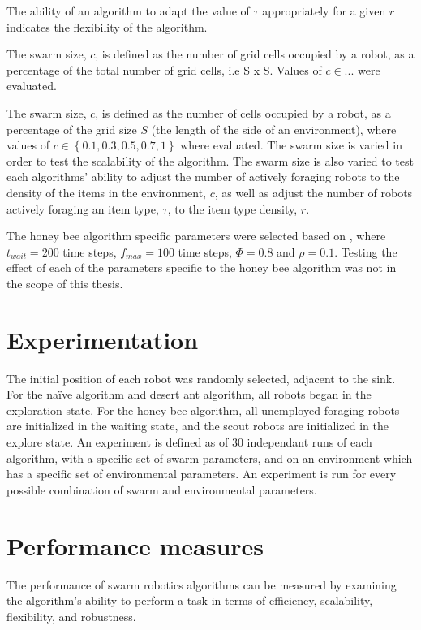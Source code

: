 The ability of an algorithm to adapt the value of $\tau$ appropriately for a given $r$ indicates the flexibility of the algorithm.

The swarm size, $c$, is defined as the number of grid cells occupied by a robot, as a percentage of the total number of grid cells, i.e S x S. Values of $c\in{...}$ were evaluated.

The swarm size, $c$, is defined as the number of cells occupied by a robot, as a percentage of the grid size $S$ (the length of the side of an environment), where values of $c\in\left\{0.1, 0.3, 0.5, 0.7, 1\right\}$ where evaluated. The swarm size is varied in order to test the scalability of the algorithm. The swarm size is also varied to test each algorithms' ability to adjust the number of actively foraging robots to the density of the items in the environment, $c$, as well as adjust the number of robots actively foraging an item type, $\tau$, to the item type density, $r$.

The honey bee algorithm specific parameters were selected based on \cite{seeley2009wisdom}, where $t_{wait}=200$ time steps, $f_{max}=100$ time steps, $\Phi=0.8$ and $\rho=0.1$. Testing the effect of each of the parameters specific to the honey bee algorithm was not in the scope of this thesis.

\section{Experimentation}
\label{experimentation}

The initial position of each robot was randomly selected, adjacent to the sink. For the na\"ive algorithm and desert ant algorithm, all robots began in the exploration state. For the honey bee algorithm, all unemployed foraging robots are initialized in the waiting state, and the scout robots are initialized in the explore state. 
An experiment is defined as of 30 independant runs of each algorithm, with a specific set of swarm parameters, and on an environment which has a specific set of environmental parameters. An experiment is run for every possible combination of swarm and environmental parameters.

\section{Performance measures}
\label{thri:third:performancemeasures}

The performance of swarm robotics algorithms can be measured by examining the algorithm's ability to perform a task in terms of efficiency, scalability, flexibility, and robustness.

